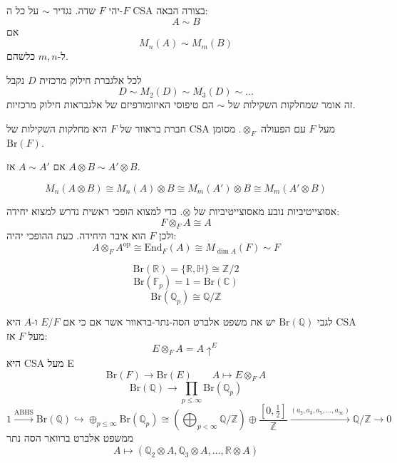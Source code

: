 \documentclass{tstextbook}
\begin{document}
\begin{definition}
יהי \(F\) שדה. נגדיר \(\sim\) על כל ה-\(F\) CSA בצורה הבאה:
$$A\sim  B$$
אם
$$M_{n}(A)\sim  M_{m}(B)$$
ל-\(m,n\) כלשהם.

\end{definition}
\begin{example}
לכל אלגברת חילוק מרכזית \(D\) נקבל
$$D\sim  M_{2}(D)\sim  M_{3}(D)\sim \dots$$
זה אומר שמחלקות השקילות של \(\sim\) הם טיפוסי האיזומורפיזם של אלגבראות חילוק מרכזיות.

\end{example}
\begin{definition}
חברת בראוור של \(F\) היא מחלקות השקילות של CSA מעל \(F\) עם הפעולה \(\otimes_{F}\). מסומן \(\text{Br}(F)\).

\end{definition}
\begin{proposition}
אם \(A\sim A'\) אז \(A\otimes B\sim A'\otimes B\).

\end{proposition}
\begin{corollary}
$$M_{n}(A\otimes B)\cong  M_{n}(A)\otimes B\cong  M_{m}(A')\otimes B\cong M_{m}(A'\otimes B)$$

\end{corollary}
אסוצייטיביות נובע מאסוצייטיביות של \(\otimes\). כדי למצוא הופכי ראשית נדרש למצוא יחידה:
$$F\otimes_{F}A\cong  A$$
ולכן \(F\) הוא איבר היחידה. כעת ההופכי יהיה:
$$A\otimes _{F}A^{\text{op}}\cong  \mathrm{End} _{F}(A)\cong M_{\dim A}(F)\sim  F$$

\begin{example}
$$\text{Br}(\mathbb{R})=\{ \mathbb{R},\mathbb{H}  \}\cong  \mathbb{Z} / 2$$$$\mathrm{Br}(\mathbb{F} _{p})=1=\mathrm{Br}(\mathbb{C})$$$$\mathrm{Br}(\mathbb{Q} _{p})\cong \mathbb{Q} / \mathbb{Z}$$

\end{example}
\begin{example}
לגבי \(\mathrm{Br}(\mathbb{Q})\) יש את משפט אלברט הסה-נתר-בראוור אשר אם כי אם \(E / F\) ו-\(A\) היא CSA מעל \(F\) אז:
$$E\otimes _{F}A=A\uparrow^{E}$$
היא CSA מעל E
$$\mathrm{Br}(F)\to \mathrm{Br}(E)\qquad A\mapsto E\otimes_{F}A$$$$\mathrm{Br}(\mathbb{Q} )\to \prod_{p\leq  \infty} \mathrm{Br}(\mathbb{Q} _{p})$$$$1\xrightarrow{\text{ABHS}}\mathrm{Br}(\mathbb{Q} )\hookrightarrow \oplus_{p\leq  \infty}\mathrm{ Br}(\mathbb{Q} _{p})\cong (\bigoplus_{p<\infty} \mathbb{Q} / \mathbb{Z}) \oplus \frac{\left[ 0,\frac{1}{2} \right]}{\mathbb{Z}}\xrightarrow{(a_{2},a_{3},a_{5},\dots, a_{\infty})} \mathbb{Q} / \mathbb{Z} \to 0$$
ממשפט אלברט ברוואר הסה נתר
$$A\mapsto(\mathbb{Q}_{2}\otimes A,\mathbb{Q} _{3}\otimes A, \dots,\mathbb{R}\otimes A)$$

\end{example}
\end{document}
